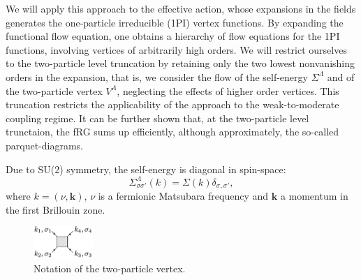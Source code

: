 We will apply this approach to the effective action, whose expansions in the fields generates the one-particle irreducible (1PI) vertex functions. By expanding the functional flow equation,\cite{Wetterich1993} one obtains a hierarchy of flow equations for the 1PI functions, involving vertices of arbitrarily  high orders. 
We will restrict ourselves to the two-particle level truncation by retaining only the two lowest nonvanishing orders in the expansion, that is, we consider the flow of the self-energy $\Sigma^\Lambda$ and of the two-particle vertex $V^\Lambda$, neglecting the effects of higher order vertices. 
This truncation restricts the applicability of the approach to the weak-to-moderate coupling regime.\cite{Salmhofer2001} 
It can be further shown that, at the two-particle level trunctaion, the fRG sums up efficiently, although approximately, the so-called parquet-diagrams.\cite{Kugler2017}
  
Due to SU(2) symmetry, the self-energy is diagonal in spin-space: 
\begin{equation}
\Sigma^\Lambda_{\sigma\sigma'}(k)=\Sigma(k)\delta_{\sigma,\sigma'}, 
\end{equation}
where $k=(\nu,\mathbf{k})$, $\nu$ is a fermionic Matsubara frequency and $\mathbf{k}$ a momentum in the first Brillouin zone. 
\begin{figure}[t!]
\includegraphics[width=0.2\textwidth]{images/VertexBox.png}
\caption{Notation of the two-particle vertex.} 
\label{fig:notvert} 
\end{figure}

